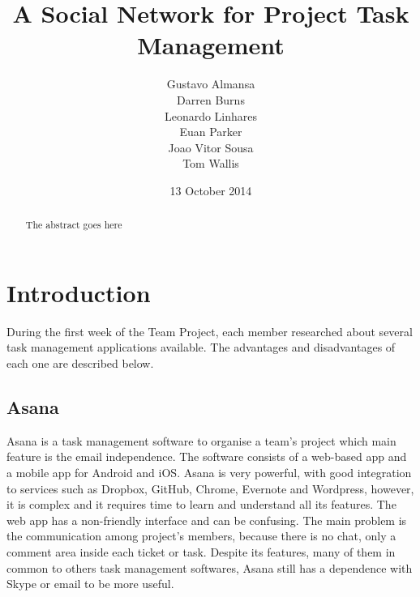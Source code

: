 \documentclass[a4paper]{l3proj}
\begin{document}
\title{A Social Network for Project Task Management}
\author{Gustavo Almansa\\
        Darren Burns \\
        Leonardo Linhares \\
        Euan Parker \\
        Joao Vitor Sousa \\
	Tom Wallis \\
}
\date{13 October 2014}
\maketitle
\begin{abstract}

The abstract goes here

\end{abstract}
\educationalconsent
\tableofcontents
\chapter{Introduction}
\label{intro}

During the first week of the Team Project, each member researched about several
task management applications available. The advantages and disadvantages of each
one are described below.

\section{Asana}
\label{asana}

Asana is a task management software to organise a team's project which main
feature is the email independence. The software consists of a web-based app and
a mobile app for Android and iOS. Asana is very powerful, with good integration
to services such as Dropbox, GitHub, Chrome, Evernote and Wordpress, however, it
is complex and it requires time to learn and understand all its features. The
web app has a non-friendly interface and can be confusing. The main problem is
the communication among project's members, because there is no chat, only a
comment area inside each ticket or task. Despite its features, many of them in
common to others task management softwares, Asana still has a dependence with
Skype or email to be more useful.
\end{document}
